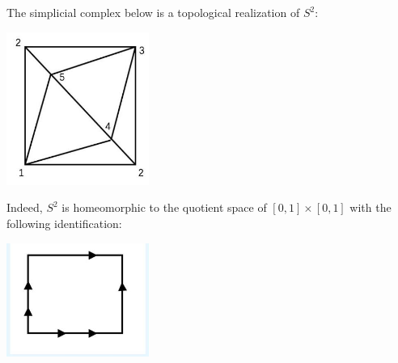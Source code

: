 \begin{example}
The simplicial complex below is a topological realization of \({S}^{2}\):
\begin{center}
\includegraphics[width=0.35\textwidth]{images/Ch4_S1_triangle.jpg}
\end{center}
Indeed, $S^2$ is homeomorphic to the quotient space of $[0,1] \times [0,1]$ with the following identification:
\begin{center}
\includegraphics[width=0.35\textwidth]{images/Ch4_S1_quotient.jpg}
\end{center}
\end{example}

